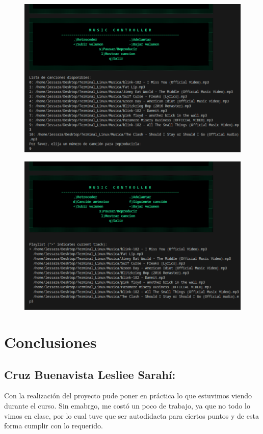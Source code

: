 \documentclass[letter,12pt]{article} %
\begin{document}
\begin{figure}[H]
	\centering
        \includegraphics[scale=0.6]{imagenes/musica3.png}
\end{figure}
\begin{figure}[H]
	\centering
        \includegraphics[scale=0.6]{imagenes/musica4.png}
\end{figure}

\section{Conclusiones}
\subsection*{Cruz Buenavista Lesliee Sarahí:}
Con la realización del proyecto pude poner en práctica lo que estuvimos viendo durante el curso. Sin emabrgo, me costó un poco de trabajo, ya que no todo lo vimos en clase, por lo cual tuve que ser autodidacta para ciertos puntos y de esta forma cumplir con lo requerido.
\\\\
\end{document}
